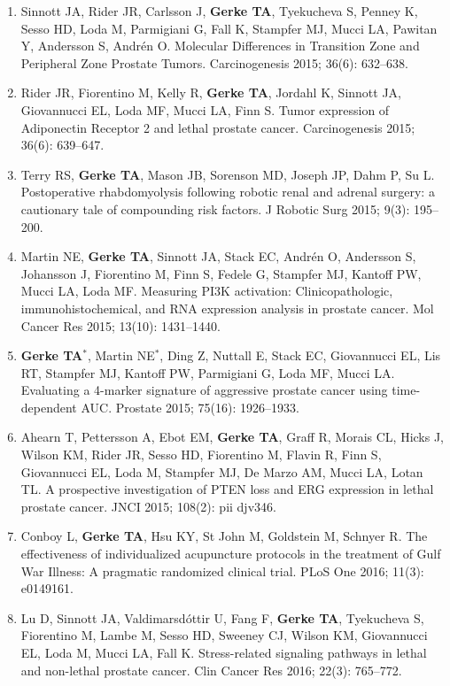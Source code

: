 \documentclass[11pt, a4paper]{article} %
\begin{document}
\begin{enumerate}[leftmargin=*]
\item{} Sinnott JA, Rider JR, Carlsson J, {\bf Gerke TA}, Tyekucheva S, Penney K, Sesso HD, Loda M, Parmigiani G, Fall K, Stampfer MJ, Mucci LA, Pawitan Y, Andersson S, Andr\'{e}n O. Molecular Differences in Transition Zone and Peripheral Zone Prostate Tumors. Carcinogenesis 2015; 36(6): 632--638.

\item{} Rider JR, Fiorentino M, Kelly R, {\bf Gerke TA}, Jordahl K, Sinnott JA, Giovannucci EL, Loda MF, Mucci LA, Finn S. Tumor expression of {Adiponectin Receptor 2} and lethal prostate cancer. Carcinogenesis 2015; 36(6): 639--647.

\item{} Terry RS, {\bf Gerke TA}, Mason JB, Sorenson MD, Joseph JP, Dahm P, Su L. Postoperative rhabdomyolysis following robotic renal and adrenal surgery: a cautionary tale of compounding risk factors. J Robotic Surg 2015; 9(3): 195--200.

\item{} Martin NE, {\bf Gerke TA}, Sinnott JA, Stack EC, Andr\'{e}n O, Andersson S, Johansson J, Fiorentino M, Finn S, Fedele G, Stampfer MJ, Kantoff PW, Mucci LA, Loda MF. Measuring PI3K activation: Clinicopathologic, immunohistochemical, and RNA expression analysis in prostate cancer. Mol Cancer Res 2015; 13(10): 1431--1440.

\item{} {\bf Gerke TA$^*$}, Martin NE$^*$, Ding Z, Nuttall E, Stack EC, Giovannucci EL, Lis RT, Stampfer MJ, Kantoff PW, Parmigiani G, Loda MF, Mucci LA. Evaluating a 4-marker signature of aggressive prostate cancer using time-dependent AUC. Prostate 2015; 75(16): 1926--1933.

\item{} Ahearn T, Pettersson A, Ebot EM, {\bf Gerke TA}, Graff R, Morais CL, Hicks J, Wilson KM, Rider JR, Sesso HD, Fiorentino M, Flavin R, Finn S, Giovannucci EL, Loda M, Stampfer MJ, De Marzo AM, Mucci LA, Lotan TL. A prospective investigation of PTEN loss and ERG expression in lethal prostate cancer. JNCI 2015; 108(2): pii djv346.

\item{} Conboy L, {\bf Gerke TA}, Hsu KY, {St John} M, Goldstein M, Schnyer R. The effectiveness of individualized acupuncture protocols in the treatment of Gulf War Illness: A pragmatic randomized clinical trial. PLoS One 2016; 11(3): e0149161.

\item{} Lu D, Sinnott JA, Valdimarsd\'{o}ttir U, Fang F, {\bf Gerke TA}, Tyekucheva S, Fiorentino M, Lambe M, Sesso HD, Sweeney CJ, Wilson KM, Giovannucci EL, Loda M, Mucci LA, Fall K. Stress-related signaling pathways in lethal and non-lethal prostate cancer. Clin Cancer Res 2016; 22(3): 765--772.


\end{enumerate}
\end{document}
